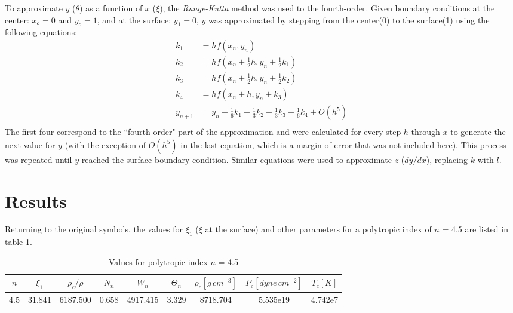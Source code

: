 \documentclass[12pt]{article}
\begin{document}
To approximate $y$ ($\theta$) as a function of $x$ ($\xi$), the \emph{Runge-Kutta}
method\cite{recipes} was used to the fourth-order. Given boundary conditions at the
center: $x_o = 0$ and $y_o = 1$, and at the surface: $y_1 = 0$, $y$
was approximated by stepping from the center(0) to the surface(1)
using the following equations:
\begin{align*}
k_1 &= hf(x_n,y_n)\\
k_2 &= hf(x_n+\frac{1}{2}h,y_n+\frac{1}{2}k_1)\\
k_3 &= hf(x_n+\frac{1}{2}h,y_n+\frac{1}{2}k_2)\\
k_4 &= hf(x_n+h,y_n+k_3)\\
y_{n+1} &=
y_n+\frac{1}{6}k_1+\frac{1}{3}k_2+\frac{1}{3}k_3+\frac{1}{6}k_4+O(h^5)\\
\end{align*}
 The first four correspond to the ``fourth order" part of the
approximation and were calculated for every step $h$ through $x$ to
generate the next value for $y$ (with the exception 
of $O(h^5)$ in the last equation, which is 
a margin of error that was not included here).
This process was
repeated until $y$ reached the surface boundary condition.
Similar equations were used to approximate
$z$ ($dy/dx$), replacing $k$ with $l$.

\section{Results}
Returning to the original symbols, the values for $\xi_1$ ($\xi$ at
the surface) and
other parameters for a polytropic index of $n$ = 4.5 are listed in
table \ref{table:nonlin}. 

\begin{table}[h]
\caption{Values for polytropic index $n$ = 4.5}
\centering
\begin{tabular}{ c c c c c c c c c  }
 \hline\hline
$n$ & $\xi_1$ & $\rho_c/\rho$ & $N_{n}$ & $W_n$ & $\Theta_n$ 
& $\rho_c[g\,cm^{-3}]$ & $P_c[dyne\,cm^{-2}]$ & $T_c[K]$ \\
\hline
4.5 & 31.841 & 6187.500 & 0.658 & 4917.415 & 3.329 & 8718.704 &
5.535e19 & 4.742e7 \\
\hline
\end{tabular}\\
\label{table:nonlin}
\end{table}
\end{document}
